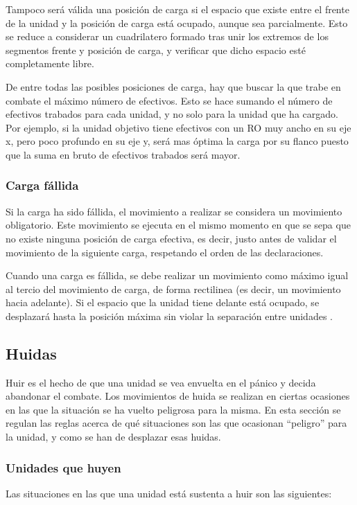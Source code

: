 Tampoco será válida una posición de carga si el espacio que existe
entre el frente de la unidad y la posición de carga está ocupado,
aunque sea parcialmente. Esto se reduce a considerar un cuadrilatero
formado tras unir los extremos de los segmentos frente y posición de carga, y verificar que dicho espacio
esté completamente libre.

De entre todas las posibles
posiciones de carga, hay que buscar la que trabe en combate el máximo
número de efectivos. Esto se hace sumando el número de efectivos
trabados para cada unidad, y no solo para la unidad que ha
cargado. Por ejemplo, si la unidad objetivo tiene efectivos con un
RO muy ancho en su eje x, pero poco profundo en su eje y, será mas
óptima la carga por su flanco puesto que la suma en bruto de efectivos trabados
será mayor.

\subsubsection*{Carga fállida}
\label{cargafallida}
Si la carga ha sido fállida, el movimiento a realizar se considera un
movimiento obligatorio. Este movimiento se ejecuta en el mismo momento
en que se sepa que no existe ninguna posición de carga efectiva, es
decir, justo antes de validar el movimiento de la siguiente carga,
respetando el orden de las declaraciones.

Cuando una carga es fállida, se debe realizar un movimiento como
máximo igual al tercio del movimiento de carga, de forma rectilinea (es decir, un
movimiento hacia adelante). Si el espacio que la unidad tiene delante
está ocupado, se desplazará hasta la posición máxima sin violar la
separación entre unidades .

\subsection*{Huidas}
\label{huidas}
Huir es el hecho de que una unidad se vea envuelta en el pánico y
decida abandonar el combate. Los movimientos de huida se realizan en
ciertas ocasiones en las que la situación se ha vuelto peligrosa para
la misma. En esta sección se regulan las reglas acerca de qué
situaciones son las que ocasionan ``peligro'' para la unidad, y como
se han de desplazar esas huidas.

\subsubsection*{Unidades que huyen}
\label{unidadhuye}
Las situaciones en las que una unidad está sustenta a huir son las siguientes:


